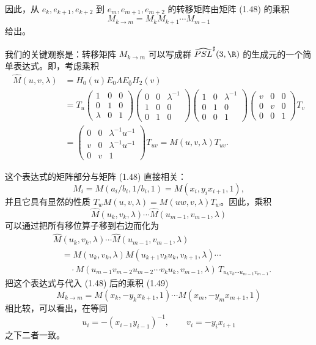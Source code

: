 因此，从 $e_k,e_{k+1},e_{k+2}$ 到 $e_m,e_{m+1},e_{m+2}$ 的转移矩阵由矩阵 (1.48) 的乘积
\begin{equation}
M_{k\to m}=M_kM_{k+1}\cdots M_{m-1}
\tag{1.49}\label{eq:1.49}
\end{equation}
给出。

我们的关键观察是：转移矩阵 $M_{k\to m}$ 可以写成群 $\widehat{PSL}^{\sharp}(3,\R)$ 的生成元的一个简单表达式。即，考虑乘积
\begin{equation}
\begin{aligned}
\hat M(u,v,\lambda)&=H_0(u)E_0\Lambda E_{\bar0}H_2(v)\\
&=T_u\begin{pmatrix}1&0&0\\0&1&0\\ \lambda&0&1\end{pmatrix}
\begin{pmatrix}0&0&\lambda^{-1}\\1&0&0\\0&1&0\end{pmatrix}
\begin{pmatrix}1&0&\lambda^{-1}\\0&1&0\\0&0&1\end{pmatrix}
\begin{pmatrix}v&0&0\\0&v&0\\0&0&1\end{pmatrix}T_v\\
&=\begin{pmatrix}0&0&\lambda^{-1}u^{-1}\\ v&0&\lambda^{-1}u^{-1}\\0&v&1\end{pmatrix}T_{uv}=M(u,v,\lambda)T_{uv}.
\end{aligned}
\tag{1.50}\label{eq:1.50}
\end{equation}

这个表达式的矩阵部分与矩阵 (1.48) 直接相关：
\[
M_i=M(a_i/b_i,1/b_i,1)=M(x_i,y_ix_{i+1},1),
\]
并且它具有显然的性质 $T_wM(u,v,\lambda)=M(uw,v,\lambda)T_w$。因此，乘积
\[
\hat M(u_k,v_k,\lambda)\cdots\hat M(u_{m-1},v_{m-1},\lambda)
\]
可以通过把所有移位算子移到右边而化为
\[
\begin{aligned}
&\hat M(u_k,v_k,\lambda)\cdots\hat M(u_{m-1},v_{m-1},\lambda)\\
&\quad=M(u_k,v_k,\lambda)M(u_{k+1}v_ku_k,v_{k+1},\lambda)\cdots\\
&\qquad\cdot M(u_{m-1}v_{m-2}u_{m-2}\cdots v_ku_k,v_{m-1},\lambda)\,T_{u_kv_k\cdots u_{m-1}v_{m-1}}.
\end{aligned}
\]
把这个表达式与代入 (1.48) 后的乘积 (1.49)
\[
M_{k\to m}=M(x_k,-y_kx_{k+1},1)\cdots M(x_m,-y_mx_{m+1},1)
\]
相比较，可以看出，在等同
\begin{equation}
u_i=-(x_{i-1}y_{i-1})^{-1},\qquad v_i=-y_ix_{i+1}
\tag{1.51}\label{eq:1.51}
\end{equation}
之下二者一致。

